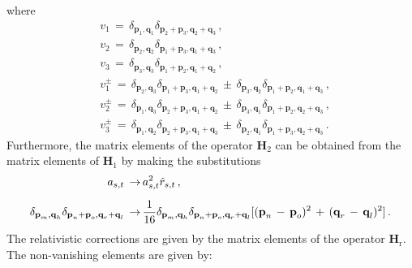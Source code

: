 \documentclass[12pt,prd,tightenlines,nofootinbib]{revtex4-2}
\begin{document}
where
\begin{align}
    &v_{1}\,=\, \delta_{\textbf{p}_{1},\textbf{q}_{1}}\delta_{\textbf{p}_{2}+\textbf{p}_{3},\textbf{q}_{2}+\textbf{q}_{3}}\,,\\[2mm]
    &v_{2}\,=\, \delta_{\textbf{p}_{2},\textbf{q}_{2}}\delta_{\textbf{p}_{1}+\textbf{p}_{3},\textbf{q}_{1}+\textbf{q}_{3}}\,,\\[2mm]
    &v_{3}\,=\, \delta_{\textbf{p}_{3},\textbf{q}_{3}}\delta_{\textbf{p}_{1}+\textbf{p}_{2},\textbf{q}_{1}+\textbf{q}_{2}}\,,\\[2mm]
    &v^{\pm}_{1}\,=\, \delta_{\textbf{p}_{2},\textbf{q}_{3}}\delta_{\textbf{p}_{1}+\textbf{p}_{3},\textbf{q}_{1}+\textbf{q}_{2}}\,\pm\,\delta_{\textbf{p}_{3},\textbf{q}_{2}}\delta_{\textbf{p}_{1}+\textbf{p}_{2},\textbf{q}_{1}+\textbf{q}_{3}}\,,\\[2mm]
    &v^{\pm}_{2}\,=\, \delta_{\textbf{p}_{1},\textbf{q}_{3}}\delta_{\textbf{p}_{2}+\textbf{p}_{3},\textbf{q}_{1}+\textbf{q}_{2}}\,\pm\,\delta_{\textbf{p}_{3},\textbf{q}_{1}}\delta_{\textbf{p}_{1}+\textbf{p}_{2},\textbf{q}_{2}+\textbf{q}_{3}}\,,\\[2mm]
    &v^{\pm}_{3}\,=\, \delta_{\textbf{p}_{1},\textbf{q}_{2}}\delta_{\textbf{p}_{2}+\textbf{p}_{3},\textbf{q}_{1}+\textbf{q}_{3}}\,\pm\,\delta_{\textbf{p}_{2},\textbf{q}_{1}}\delta_{\textbf{p}_{1}+\textbf{p}_{3},\textbf{q}_{2}+\textbf{q}_{3}}\,.
\end{align}
Furthermore, the matrix elements of the operator $\textbf{H}_{2}$ can be obtained from the matrix elements of $\textbf{H}_{1}$ by making the substitutions
\begin{align}
    a_{s,t}\,\to\,& a_{s,t}^{2}\Hat{r}_{s,t}\,,\nonumber\\[2mm]
    \delta_{\textbf{p}_{m},\textbf{q}_{h}}\delta_{\textbf{p}_{n}+\textbf{p}_{o},\textbf{q}_{r}+\textbf{q}_{l}}\, \to\,& \frac{1}{16}\delta_{\textbf{p}_{m},\textbf{q}_{h}}\delta_{\textbf{p}_{n}+\textbf{p}_{o},\textbf{q}_{r}+\textbf{q}_{l}}[(\textbf{p}_{n}\,-\, \textbf{p}_{o})^{2}\,+ \, (\textbf{q}_{r}\, - \, \textbf{q}_{l})^{2}]\,.
\end{align}
The relativistic corrections are given by the matrix elements of the operator $\textbf{H}_{\text{r}}$. The non-vanishing elements are given by:
\end{document}
